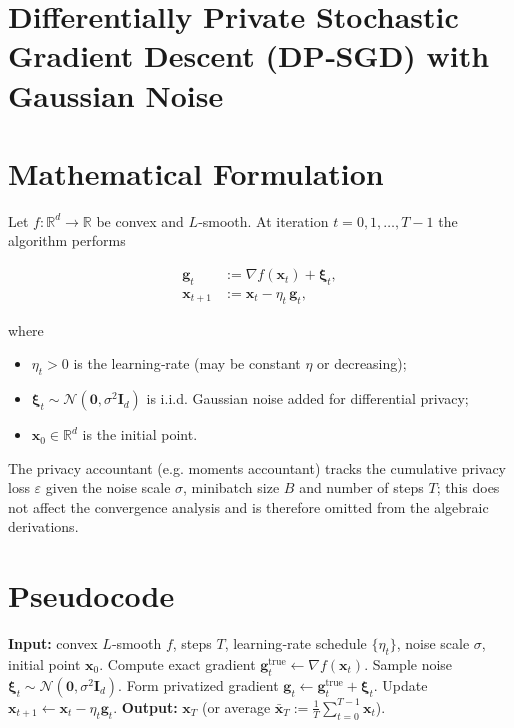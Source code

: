 \documentclass{article}
\newcommand{\R}{\mathbb{R}}
\newcommand{\grad}{\nabla}
\begin{document}
\section*{Differentially Private Stochastic Gradient Descent (DP‑SGD) with Gaussian Noise}

\section*{Mathematical Formulation}
Let $f:\R^{d}\rightarrow\R$ be convex and $L$‑smooth.  
At iteration $t=0,1,\dots,T-1$ the algorithm performs

\[
\boxed{
\begin{aligned}
\bm{g}_t &:= \grad f(\bm{x}_t)+\bm{\xi}_t,\\[2mm]
\bm{x}_{t+1} &:= \bm{x}_t - \eta_t \,\bm{g}_t,
\end{aligned}}
\tag{1}
\]

where  

\begin{itemize}[noitemsep]
\item $\eta_t>0$ is the learning‑rate (may be constant $\eta$ or decreasing);
\item $\bm{\xi}_t\sim\mathcal N(\mathbf 0,\sigma^{2}\bm I_{d})$ is i.i.d. Gaussian noise added for differential privacy;
\item $\bm{x}_0\in\R^{d}$ is the initial point.
\end{itemize}

The privacy accountant (e.g. moments accountant) tracks the cumulative privacy loss $\varepsilon$ given the noise scale $\sigma$, minibatch size $B$ and number of steps $T$; this does not affect the convergence analysis and is therefore omitted from the algebraic derivations.

\section*{Pseudocode}
\begin{algorithm}[H]
\caption{DP‑SGD with Gaussian Noise}
\begin{algorithmic}[1]
\STATE \textbf{Input:} convex $L$‑smooth $f$, steps $T$, learning‑rate schedule $\{\eta_t\}$, noise scale $\sigma$, initial point $\bm{x}_0$.
\STATE Compute exact gradient $\bm{g}^{\text{true}}_t \gets \grad f(\bm{x}_t)$.
\STATE Sample noise $\bm{\xi}_t\sim\mathcal N(\mathbf0,\sigma^{2}\bm I_{d})$.
\STATE Form privatized gradient $\bm{g}_t \gets \bm{g}^{\text{true}}_t+\bm{\xi}_t$.
\STATE Update $\bm{x}_{t+1}\gets \bm{x}_t-\eta_t\bm{g}_t$.
\ENDFOR
\STATE \textbf{Output:} $\bm{x}_T$ (or average $\bar{\bm{x}}_T:=\frac1T\sum_{t=0}^{T-1}\bm{x}_t$).
\end{algorithmic}
\end{algorithm}
\end{document}

